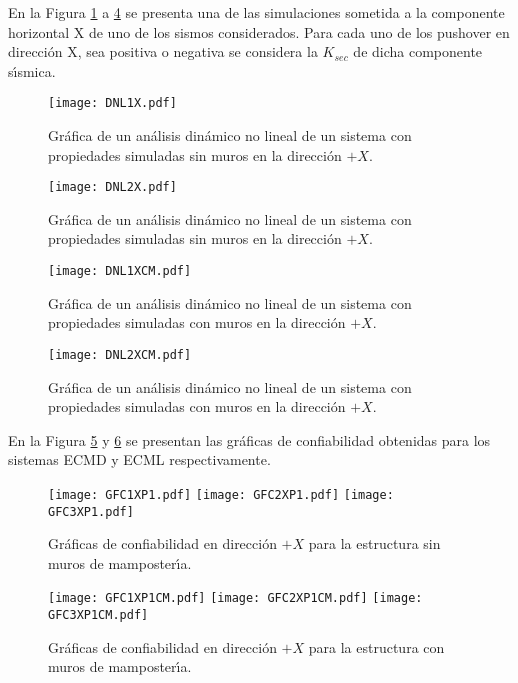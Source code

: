 En la Figura \ref{fig:apu11} a \ref{fig:apu14} se presenta una de las simulaciones sometida a la componente horizontal X de uno de los sismos considerados. Para cada uno de los pushover en direcci\'on X, sea positiva o negativa se considera la $K_{sec}$ de dicha componente s\'{\i}smica. 

\begin{figure} [htbp]
\texttt{[image: DNL1X.pdf]}
\caption{Gr\'afica de un an\'alisis din\'amico no lineal de un sistema con propiedades simuladas sin muros en la direcci\'on $+X$.}
\label{fig:apu11}
\end{figure}

\begin{figure} [htbp]
\texttt{[image: DNL2X.pdf]}
\caption{Gr\'afica de un an\'alisis din\'amico no lineal de un sistema con propiedades simuladas sin muros en la direcci\'on $+X$.}
\label{fig:apu12}
\end{figure}

\begin{figure} [htbp]
\texttt{[image: DNL1XCM.pdf]}
\caption{Gr\'afica de un an\'alisis din\'amico no lineal de un sistema con propiedades simuladas con muros en la direcci\'on $+X$.}
\label{fig:apu13}
\end{figure}

\begin{figure} [htbp]
\texttt{[image: DNL2XCM.pdf]}
\caption{Gr\'afica de un an\'alisis din\'amico no lineal de un sistema con propiedades simuladas con muros en la direcci\'on $+X$.}
\label{fig:apu14}
\end{figure}

En la Figura \ref{fig:apu15} y \ref{fig:apu16} se presentan las gr\'aficas de confiabilidad obtenidas para los sistemas ECMD y ECML respectivamente.

\begin{figure} [htbp]
\centering
\texttt{[image: GFC1XP1.pdf]}
\texttt{[image: GFC2XP1.pdf]}
\texttt{[image: GFC3XP1.pdf]}
\caption{Gr\'aficas de confiabilidad en direcci\'on $+X$ para la estructura sin muros de mamposter\'{\i}a.}
\label{fig:apu15}
\end{figure}

\begin{figure} [htbp]
\centering
\texttt{[image: GFC1XP1CM.pdf]}
\texttt{[image: GFC2XP1CM.pdf]}
\texttt{[image: GFC3XP1CM.pdf]}
\caption{Gr\'aficas de confiabilidad en direcci\'on $+X$ para la estructura con muros de mamposter\'{\i}a.}
\label{fig:apu16}
\end{figure}

